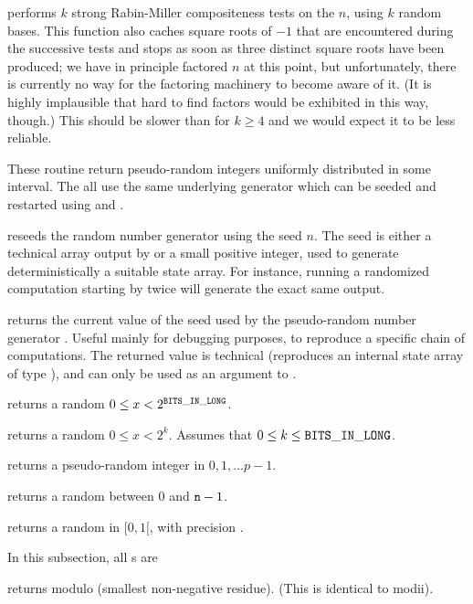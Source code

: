  performs $k$ strong Rabin-Miller
compositeness tests on the  $n$, using $k$ random bases. This
function also caches square roots of $-1$ that are encountered during the
successive tests and stops as soon as three distinct square roots have been
produced; we have in principle factored $n$ at this point, but
unfortunately, there is currently no way for the factoring machinery to
become aware of it. (It is highly implausible that hard to find factors
would be exhibited in this way, though.) This should be slower than
 for $k\geq 4$ and we would expect it to be less reliable.

These routine return pseudo-random integers uniformly distributed in some
interval. The all use the same underlying generator which can be seeded and
restarted using  and .

 reseeds the random number generator using the
seed $n$. The seed is either a technical array output by 
or a small positive integer, used to generate deterministically a suitable
state array. For instance, running a randomized computation starting by
 twice will generate the exact same output.

 returns the current value of the seed used by the
pseudo-random number generator . Useful mainly for debugging
purposes, to reproduce a specific chain of computations. The returned value
is technical (reproduces an internal state array of type ),
and can only be used as an argument to .

 returns a random $0 \leq x < 2^{\tt BITS\_IN\_LONG}$.

 returns a random $0 \leq x < 2^k$. Assumes
that $0 \leq k \leq {\tt BITS\_IN\_LONG}$.

 returns a pseudo-random integer
in $0, 1, \dots p-1$.

 returns a random  between $0$ and ${\tt n}
- 1$.

 returns a random  in $[0,1[$, with
precision .

 In this subsection, all s are 

 returns  modulo  (smallest
non-negative residue). (This is identical to modii).

